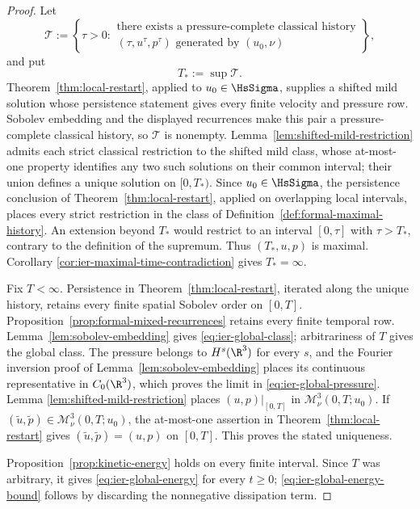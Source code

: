 \begin{proof}
 Let
 \[
  \mathscr T:=\left\{\tau>0:
  \begin{array}{c}
  \text{there exists a pressure-complete classical history}\\
  (\tau,u^\tau,p^\tau)\text{ generated by }(u_0,\nu)
  \end{array}
  \right\},
 \]
 and put
\[
 T_*:=\sup\mathscr T.
\]
 Theorem~\ref{thm:local-restart}, applied to \(u_0\in\HsSigma\), supplies a
 shifted mild solution whose persistence statement gives every finite
 velocity and pressure row.  Sobolev embedding and the displayed recurrences
 make this pair a pressure-complete classical history, so \(\mathscr T\) is
 nonempty.
 Lemma~\ref{lem:shifted-mild-restriction} admits each strict classical
restriction to the shifted mild class, whose at-most-one property identifies
any two such solutions on their common interval; their union defines a unique
 solution on \([0,T_*)\).  Since \(u_0\in\HsSigma\), the persistence conclusion
of Theorem~\ref{thm:local-restart}, applied on overlapping local intervals,
places every strict restriction in the class of
Definition~\ref{def:formal-maximal-history}.  An extension beyond \(T_*\)
would restrict to an interval \([0,\tau]\) with \(\tau>T_*\), contrary to
the definition of the supremum.  Thus \((T_*,u,p)\) is maximal.  Corollary
\ref{cor:ier-maximal-time-contradiction} gives \(T_*=\infty\).

Fix \(T<\infty\).  Persistence in Theorem~\ref{thm:local-restart}, iterated
along the unique history, retains every finite spatial Sobolev order on
\([0,T]\).  Proposition~\ref{prop:formal-mixed-recurrences} retains every
finite temporal row.  Lemma~\ref{lem:sobolev-embedding} gives
\eqref{eq:ier-global-class}; arbitrariness of \(T\) gives the global class.
The pressure belongs to \(H^s(\R^3)\) for every \(s\), and the Fourier
inversion proof of Lemma~\ref{lem:sobolev-embedding} places its continuous
representative in \(C_0(\R^3)\), which proves the limit in
\eqref{eq:ier-global-pressure}.  Lemma
\ref{lem:shifted-mild-restriction} places \((u,p)|_{[0,T]}\) in
\(\mathscr M_\nu^3(0,T;u_0)\).  If
\((\widetilde u,\widetilde p)\in\mathscr M_\nu^3(0,T;u_0)\), the at-most-one
assertion in Theorem~\ref{thm:local-restart} gives
\((\widetilde u,\widetilde p)=(u,p)\) on \([0,T]\).  This proves the stated
uniqueness.

Proposition~\ref{prop:kinetic-energy} holds on every finite interval.  Since
\(T\) was arbitrary, it gives \eqref{eq:ier-global-energy} for every
\(t\ge0\); \eqref{eq:ier-global-energy-bound} follows by discarding the
nonnegative dissipation term.
\end{proof}
